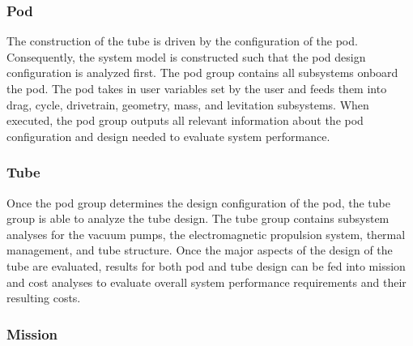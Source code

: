 \subsubsection{Pod}

The construction of the tube is driven by the configuration of the pod. Consequently, the system model is constructed such that the pod design configuration is analyzed first. The pod group contains all subsystems onboard the pod. The pod takes in user variables set by the user and feeds them into drag, cycle, drivetrain, geometry, mass, and levitation subsystems. When executed, the pod group outputs all relevant information about the pod configuration and design needed to evaluate system performance.

\subsubsection{Tube}

Once the pod group determines the design configuration of the pod, the tube group is able to analyze the tube design. The tube group contains subsystem analyses for the vacuum pumps, the electromagnetic propulsion system, thermal management, and tube structure. Once the major aspects of the design of the tube are evaluated, results for both pod and tube design can be fed into mission and cost analyses to evaluate overall system performance requirements and their resulting costs. 


\subsubsection{Mission}

